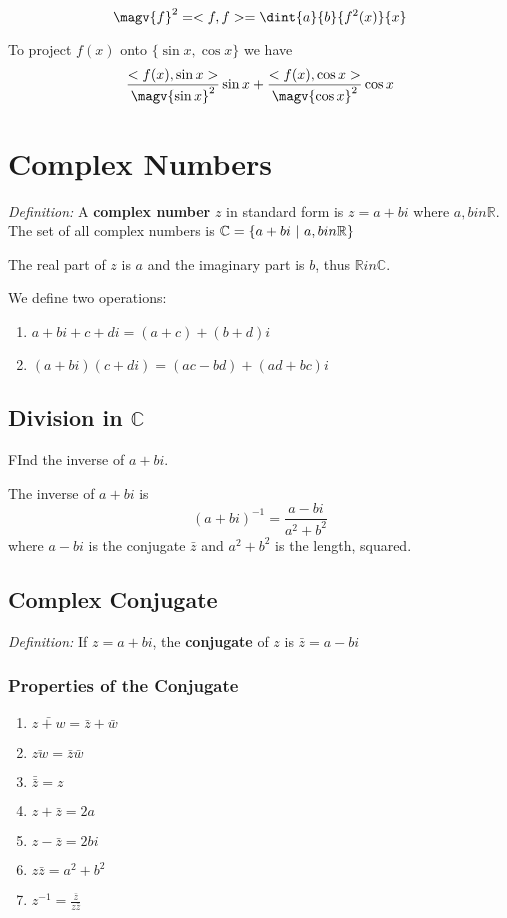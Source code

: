 \documentclass[12pt]{article}
\begin{document}
\[ \magv{f}^2 = <f,f> = \dint{a}{b}{f^2(x)}{x} \]

To project $f(x)$ onto $\{\sin x,\cos x\}$ we have \[ \frac{<f(x),\sin x>}{\magv{\sin x}^2}\sin x + \frac{<f(x),\cos x>}{\magv{\cos x}^2}\cos x \]

\section*{Complex Numbers}

\textit{Definition:} A {\bf complex number} $z$ in standard form is $z = a + bi$ where $a, b in \mathbb{R}$. The set of all complex numbers is $\mathbb{C} = \{a + bi \ |\  a, b in \mathbb{R}\}$

The real part of $z$ is $a$ and the imaginary part is $b$, thus $\mathbb{R} in \mathbb{C}$.

We define two operations:
\begin{enumerate}
\item $a + bi + c + di = (a + c) + (b + d)i$
\item $(a + bi)(c + di) = (ac - bd) + (ad + bc)i$
\end{enumerate}

\subsection*{Division in $\mathbb{C}$}
FInd the inverse of $a + bi$.

The inverse of $a + bi$ is \[ (a + bi)^{-1} = \frac{a - bi}{a^2 + b^2} \] where $a-bi$ is the conjugate $\bar{z}$ and $a^2 + b^2$ is the length, squared.

\subsection*{Complex Conjugate}
\textit{Definition:} If $z = a + bi$, the {\bf conjugate} of $z$ is $\bar{z} = a - bi$

\subsubsection*{Properties of the Conjugate}
\begin{enumerate}
\item $\bar{z+w} = \bar{z} + \bar{w}$
\item $\bar{zw} = \bar{z}\bar{w}$
\item $\bar{\bar{z}} = z$
\item $z + \bar{z} = 2a$
\item $z - \bar{z} = 2bi$
\item $z\bar{z} = a^2 + b^2$
\item $z^{-1} = \frac{\bar{z}}{z\bar{z}}$
\end{enumerate}
\end{document}
